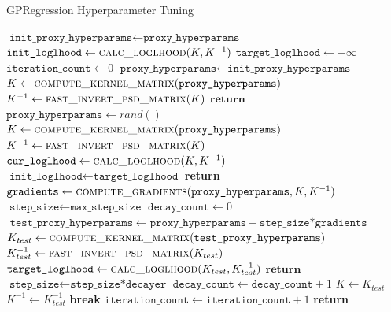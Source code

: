 \begin{algorithm}
  \caption{GPRegression Hyperparameter Tuning}\label{alg:gpreg_hyperparam_tuning}
  \begin{algorithmic}[1]
    	\State $\texttt{init\_proxy\_hyperparams} \gets \texttt{proxy\_hyperparams}$
    	\State $\texttt{init\_loglhood} \gets \textsc{calc\_loglhood}(K,K^{-1})$
    	\State $\texttt{target\_loglhood} \gets -\infty$
    	\State $\texttt{iteration\_count} \gets 0$
    					\State $\texttt{proxy\_hyperparams} \gets \texttt{init\_proxy\_hyperparams}$
    					\State $K \gets \textsc{compute\_kernel\_matrix}(\texttt{proxy\_hyperparams})$
 	 		  			\State $K^{-1} \gets \textsc{fast\_invert\_psd\_matrix}(K)$
 	 		  		\EndIf
    				\State $\textbf{return}$
    			\EndIf
  				\State $\texttt{proxy\_hyperparams} \gets rand()$
  				\State $K \gets \textsc{compute\_kernel\_matrix}(\texttt{proxy\_hyperparams})$
    			\State $K^{-1} \gets \textsc{fast\_invert\_psd\_matrix}(K)$
    			\State $\texttt{cur\_loglhood} \gets \textsc{calc\_loglhood}(K,K^{-1})$
    		\EndIf
    			\State $\texttt{init\_loglhood} \gets \texttt{target\_loglhood}$
    				\State \textbf{return}		
    			\EndIf
    		\EndIf
    		\State $\texttt{gradients} \gets \textsc{compute\_gradients}(\texttt{proxy\_hyperparams},K,K^{-1})$
    		\State $\texttt{step\_size} \gets \texttt{max\_step\_size}$
    		\State $\texttt{decay\_count} \gets 0$
    			\State $\texttt{ test\_proxy\_hyperparams} \gets \texttt{proxy\_hyperparams} - \texttt{step\_size*gradients}$
    			\State $K_{test} \gets \textsc{compute\_kernel\_matrix}(\texttt{test\_proxy\_hyperparams})$
    			\State $K_{test}^{-1} \gets \textsc{fast\_invert\_psd\_matrix}(K_{test})$
    			\State $\texttt{target\_loglhood} \gets \textsc{calc\_loglhood}(K_{test},K^{-1}_{test})$
    					\State $\textbf{return}$
    				\EndIf
    				\State $\texttt{step\_size} \gets \texttt{step\_size*decayer}$
    				\State $\texttt{decay\_count} \gets \texttt{decay\_count}+1$
    			\EndIf
    				\State $K \gets K_{test}$
    				\State $K^{-1} \gets K_{test}^{-1}$
    				\State \textbf{break}
    			\EndIf
    		\EndWhile	
    		\State $\texttt{iteration\_count} \gets \texttt{iteration\_count}+1$
    	\EndWhile
    	\State \textbf{return}
    \EndProcedure
  \end{algorithmic}
\end{algorithm}

